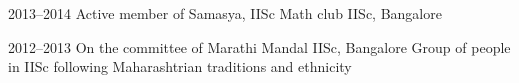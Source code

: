\documentclass[11pt]{friggeri-cv}
\begin{document}
\begin{entrylist}
  \entryyy
    {2013--2014}
    {Active member of Samasya, IISc Math club}
    {IISc, Bangalore}

\end{entrylist}




\begin{entrylist}
  \entryy
    {2012--2013}
    {On the committee of Marathi Mandal}
    {IISc, Bangalore}
    {Group of people in IISc following Maharashtrian traditions and ethnicity}
\end{entrylist}

%
%
%
\end{document}
